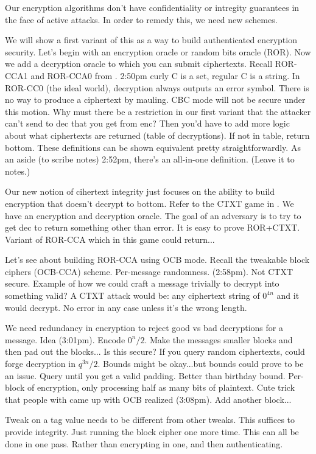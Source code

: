 Our encryption algorithms don't have confidentiality or intregity guarantees in the face of active attacks. In order to remedy this, we need new schemes.

We will show a first variant of this as a way to build authenticated encryption security.
Let's begin with an encryption oracle or random bits oracle (ROR).
Now we add a decryption oracle to which you can submit ciphertexts.
Recall ROR-CCA1 and ROR-CCA0 from .
2:50pm curly C is a set, regular C is a string. In ROR-CC0 (the ideal world), decryption always outputs an error symbol. There is no way to produce a ciphertext by mauling. CBC mode will not be secure under this motion. Why must there be a restriction in our first variant that the attacker can't send to dec that you get from enc? Then you'd have to add more logic about what ciphertexts are returned (table of decryptions). If not in table, return bottom. These definitions can be shown equivalent pretty straightforwardly.
As an aside (to scribe notes) 2:52pm, there's an all-in-one definition. (Leave it to notes.) 

Our new notion of cihertext integrity just focuses on the ability to build encryption that doesn't decrypt to bottom. Refer to the CTXT game in . We have an encryption and decryption oracle. The goal of an adversary is to try to get \textsf{dec} to return something other than error. %
It is easy to prove ROR+CTXT. Variant of ROR-CCA which in this game could return...

Let's see about building ROR-CCA using OCB mode.
Recall the tweakable block ciphers (OCB-CCA) scheme. Per-message randomness. (2:58pm). Not CTXT secure.
Example of how we could craft a message trivially to decrypt into something valid? A CTXT attack would be: any ciphertext string of $0^{4n}$ and it would decrypt. No error in any case unless it's the wrong length.

We need redundancy in encryption to reject good vs bad decryptions for a message. Idea (3:01pm). Encode $0^n / 2$. Make the messages smaller blocks and then pad out the blocks... Is this secure? If you query random ciphertexts, could forge decryption in $q^{3n} / 2$. Bounds might be okay...but bounds could prove to be an issue.
Query until you get a valid padding. Better than birthday bound.
Per-block of encryption, only processing half as many bits of plaintext.
Cute trick that people with came up with OCB realized (3:08pm). Add another block... 

Tweak on a tag value needs to be different from other tweaks. This suffices to provide integrity. Just running the block cipher one more time. This can all be done in one pass. Rather than encrypting in one, and then authenticating.